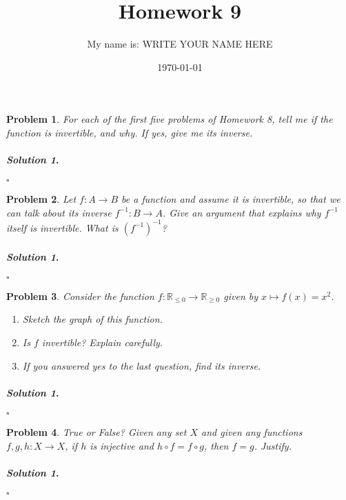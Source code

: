 \documentclass{amsart}
\theoremstyle{plain}
\newtheorem{problem}{Problem}
\newenvironment{solution}{\paragraph{\emph{Solution 1}.}}{\hfill$\square$}
\begin{document}
 

\title[Homework 9]{Homework 9}
\author{My name is:  WRITE YOUR NAME HERE}  %
\date{\today} 
\maketitle 

\begin{problem}
For each of the first five problems of Homework 8, tell me if the function is invertible, and why.  If yes, give me its inverse.
\end{problem}
\begin{solution}
\end{solution}

\begin{problem}
Let $f:A \rightarrow B$ be a function and assume it is invertible, so that we can talk about its inverse $f^{-1}:B \rightarrow A$.  Give an argument that explains why $f^{-1}$ itself is invertible.  What is $(f^{-1})^{-1}$?
\end{problem}
\begin{solution}
\end{solution}

\begin{problem}
Consider the function $f:\mathbb{R}_{\le 0} \rightarrow \mathbb{R}_{\ge 0}$ given by $x \mapsto f(x) = x^{2}$.  
\begin{enumerate}
\item Sketch the graph of this function.
\item Is $f$ invertible?  Explain carefully.
\item If you answered yes to the last question, find its inverse.
\end{enumerate}
\end{problem}
\begin{solution}
\end{solution}


\begin{problem}
True or False?  Given any set $X$ and given any functions $f,g,h:X \rightarrow X$, if $h$ is injective and $h \circ f = f \circ g$, then $f=g$.  Justify.
\end{problem}
\begin{solution}
\end{solution}
\end{document}
